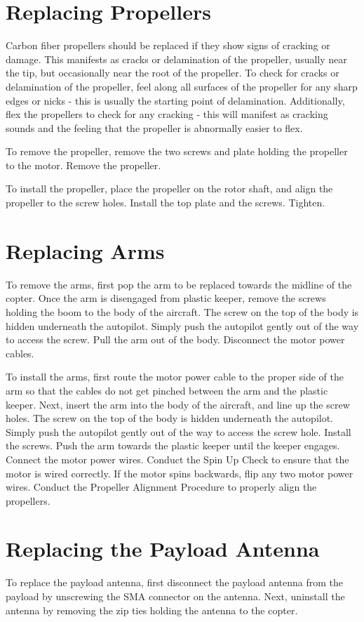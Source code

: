 \documentclass{report}
\begin{document}
	\section{Replacing Propellers}
		Carbon fiber propellers should be replaced if they show signs of cracking or damage.  This manifests as cracks or delamination of the propeller, usually near the tip, but occasionally near the root of the propeller.  To check for cracks or delamination of the propeller, feel along all surfaces of the propeller for any sharp edges or nicks - this is usually the starting point of delamination.  Additionally, flex the propellers to check for any cracking - this will manifest as cracking sounds and the feeling that the propeller is abnormally easier to flex.

		To remove the propeller, remove the two screws and plate holding the propeller to the motor.  Remove the propeller.

		To install the propeller, place the propeller on the rotor shaft, and align the propeller to the screw holes.  Install the top plate and the screws.  Tighten.
	\section{Replacing Arms}
		To remove the arms, first pop the arm to be replaced towards the midline of the copter.  Once the arm is disengaged from plastic keeper, remove the screws holding the boom to the body of the aircraft.  The screw on the top of the body is hidden underneath the autopilot.  Simply push the autopilot gently out of the way to access the screw.  Pull the arm out of the body.  Disconnect the motor power cables.

		To install the arms, first route the motor power cable to the proper side of the arm so that the cables do not get pinched between the arm and the plastic keeper.  Next, insert the arm into the body of the aircraft, and line up the screw holes.  The screw on the top of the body is hidden underneath the autopilot.  Simply push the autopilot gently out of the way to access the screw hole.  Install the screws.  Push the arm towards the plastic keeper until the keeper engages.  Connect the motor power wires.  Conduct the Spin Up Check to ensure that the motor is wired correctly.  If the motor spins backwards, flip any two motor power wires.  Conduct the Propeller Alignment Procedure to properly align the propellers.
	\section{Replacing the Payload Antenna}
		To replace the payload antenna, first disconnect the payload antenna from the payload by unscrewing the SMA connector on the antenna.  Next, uninstall the antenna by removing the zip ties holding the antenna to the copter.
\end{document}
